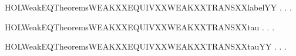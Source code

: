 \newcommand{\HOLWeakEQTheoremsWEAKXXEQUIVXXWEAKXXTRANSXXlabel}{\UseVerbatim{HOLWeakEQTheoremsWEAKXXEQUIVXXWEAKXXTRANSXXlabel}}
\begin{SaveVerbatim}{HOLWeakEQTheoremsWEAKXXEQUIVXXWEAKXXTRANSXXlabelYY}
\HOLTokenTurnstile{} \HOLSymConst{\HOLTokenForall{}} .
          \HOLSymConst{\HOLTokenImp{}}
       \HOLSymConst{\HOLTokenForall{}} .
            \HOLTokenWeakTransBegin{} \HOLTokenWeakTransEnd {} \HOLSymConst{\HOLTokenImp{}}
           \HOLSymConst{\HOLTokenExists{}}.  \HOLTokenWeakTransBegin{} \HOLTokenWeakTransEnd {} \HOLSymConst{\HOLTokenConj{}}   
\end{SaveVerbatim}
\newcommand{\HOLWeakEQTheoremsWEAKXXEQUIVXXWEAKXXTRANSXXlabelYY}{\UseVerbatim{HOLWeakEQTheoremsWEAKXXEQUIVXXWEAKXXTRANSXXlabelYY}}
\begin{SaveVerbatim}{HOLWeakEQTheoremsWEAKXXEQUIVXXWEAKXXTRANSXXtau}
\HOLTokenTurnstile{} \HOLSymConst{\HOLTokenForall{}} .
          \HOLSymConst{\HOLTokenImp{}}
       \HOLSymConst{\HOLTokenForall{}}.  \HOLTokenWeakTransBegin\HOLConst{\ensuremath{\tau}}\HOLTokenWeakTransEnd {} \HOLSymConst{\HOLTokenImp{}} \HOLSymConst{\HOLTokenExists{}}.    \HOLSymConst{\HOLTokenConj{}}   
\end{SaveVerbatim}
\newcommand{\HOLWeakEQTheoremsWEAKXXEQUIVXXWEAKXXTRANSXXtau}{\UseVerbatim{HOLWeakEQTheoremsWEAKXXEQUIVXXWEAKXXTRANSXXtau}}
\begin{SaveVerbatim}{HOLWeakEQTheoremsWEAKXXEQUIVXXWEAKXXTRANSXXtauYY}
\HOLTokenTurnstile{} \HOLSymConst{\HOLTokenForall{}} .
          \HOLSymConst{\HOLTokenImp{}}
       \HOLSymConst{\HOLTokenForall{}}.  \HOLTokenWeakTransBegin\HOLConst{\ensuremath{\tau}}\HOLTokenWeakTransEnd {} \HOLSymConst{\HOLTokenImp{}} \HOLSymConst{\HOLTokenExists{}}.    \HOLSymConst{\HOLTokenConj{}}   
\end{SaveVerbatim}
